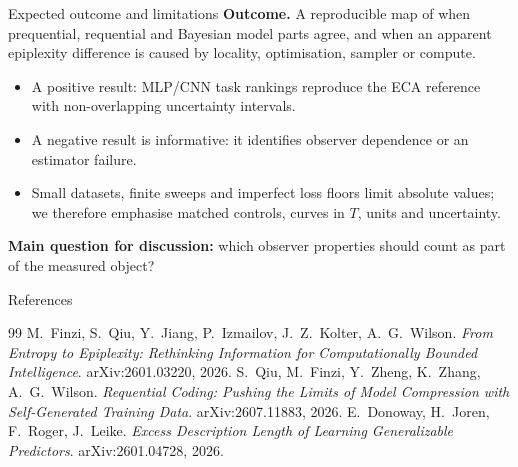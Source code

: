 \documentclass[aspectratio=43]{beamer}
\begin{document}
\begin{frame}{Expected outcome and limitations}
\textbf{Outcome.} A reproducible map of when prequential, requential and Bayesian model parts agree,
and when an apparent epiplexity difference is caused by locality, optimisation, sampler or compute.

\medskip
\begin{itemize}
\item A positive result: MLP/CNN task rankings reproduce the ECA reference with non-overlapping
      uncertainty intervals.
\item A negative result is informative: it identifies observer dependence or an estimator failure.
\item Small datasets, finite sweeps and imperfect loss floors limit absolute values; we therefore
      emphasise matched controls, curves in $T$, units and uncertainty.
\end{itemize}

\medskip
\centering
\textbf{Main question for discussion:} which observer properties should count as part of the measured object?
\end{frame}

\begin{frame}[t]{References}
\small
\begin{thebibliography}{99}
M.~Finzi, S.~Qiu, Y.~Jiang, P.~Izmailov, J.~Z.~Kolter, A.~G.~Wilson.
\newblock \emph{From Entropy to Epiplexity: Rethinking Information for Computationally Bounded Intelligence}.
\newblock arXiv:2601.03220, 2026.
S.~Qiu, M.~Finzi, Y.~Zheng, K.~Zhang, A.~G.~Wilson.
\newblock \emph{Requential Coding: Pushing the Limits of Model Compression with Self-Generated Training Data}.
\newblock arXiv:2607.11883, 2026.
E.~Donoway, H.~Joren, F.~Roger, J.~Leike.
\newblock \emph{Excess Description Length of Learning Generalizable Predictors}.
\newblock arXiv:2601.04728, 2026.
\end{thebibliography}
\end{frame}
\end{document}
